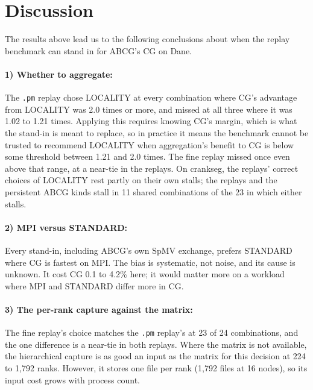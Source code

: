 \documentclass[11pt]{article}
\newcommand{\pmrep}{\texttt{.pm} replay}
\begin{document}
\section{Discussion}
\label{sec:discussion}

The results above lead us to the following conclusions about when the replay benchmark
can stand in for ABCG's CG on Dane.

\paragraph{1) Whether to aggregate:} The \pmrep{} chose LOCALITY at every combination
where CG's advantage from LOCALITY was 2.0 times or more, and missed at all three where
it was 1.02 to 1.21 times. Applying this requires knowing CG's margin, which is what the
stand-in is meant to replace, so in practice it means the benchmark cannot be trusted to
recommend LOCALITY when aggregation's benefit to CG is below some threshold between 1.21
and 2.0 times. The fine replay missed once even above that range, at a near-tie in the
replays. On crankseg, the replays' correct choices of LOCALITY rest partly on their own
stalls; the replays and the persistent ABCG kinds stall in 11 shared combinations of the 23 in which either stalls.

\paragraph{2) MPI versus STANDARD:} Every stand-in, including ABCG's own SpMV exchange,
prefers STANDARD where CG is fastest on MPI. The bias is systematic, not noise, and its
cause is unknown. It cost CG 0.1 to 4.2\% here; it would matter more on a workload where
MPI and STANDARD differ more in CG.

\paragraph{3) The per-rank capture against the matrix:} The fine replay's choice matches
the \pmrep's at 23 of 24 combinations, and the one difference is a near-tie in both
replays. Where the matrix is not available, the hierarchical capture is as good an input
as the matrix for this decision at 224 to 1,792 ranks. However, it stores one file per
rank (1,792 files at 16 nodes), so its input cost grows with process count.
\end{document}
